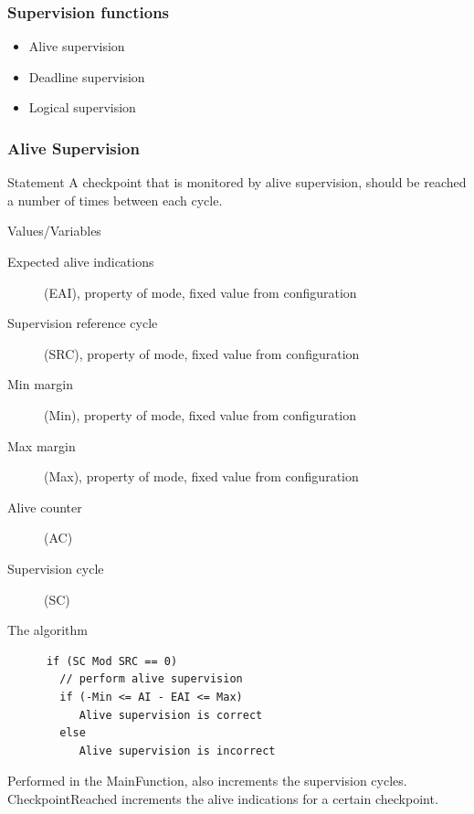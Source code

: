 \documentclass{beamer}
\begin{document}
\begin{frame}
  \frametitle{Supervision functions}
  \begin{itemize}
    \item Alive supervision
    \item Deadline supervision
    \item Logical supervision
  \end{itemize}
\end{frame}

\begin{frame}
  \frametitle{Alive Supervision}
  \begin{block}{Statement}
    A checkpoint that is monitored by alive supervision, should be
    reached a number of times between each cycle.
  \end{block}
\end{frame}

\begin{frame}
  \begin{block}{Values/Variables}
    \begin{description}
      \item[Expected alive indications] (EAI), property of mode, fixed
        value from configuration
      \item[Supervision reference cycle] (SRC), property of mode, fixed value
        from configuration
      \item[Min margin] (Min), property of mode, fixed value from configuration
      \item[Max margin] (Max), property of mode, fixed value from configuration
      \item[Alive counter] (AC)
      \item[Supervision cycle] (SC)
    \end{description}
  \end{block}
\end{frame}

\begin{frame}[fragile]
  \begin{block}{The algorithm}
    \begin{lstlisting}
      if (SC Mod SRC == 0)
        // perform alive supervision
        if (-Min <= AI - EAI <= Max)
           Alive supervision is correct
        else
           Alive supervision is incorrect
    \end{lstlisting}
  \end{block}
  Performed in the MainFunction, also increments the supervision
  cycles.\\
  CheckpointReached increments the alive indications for a certain
  checkpoint.
\end{frame}
\end{document}
